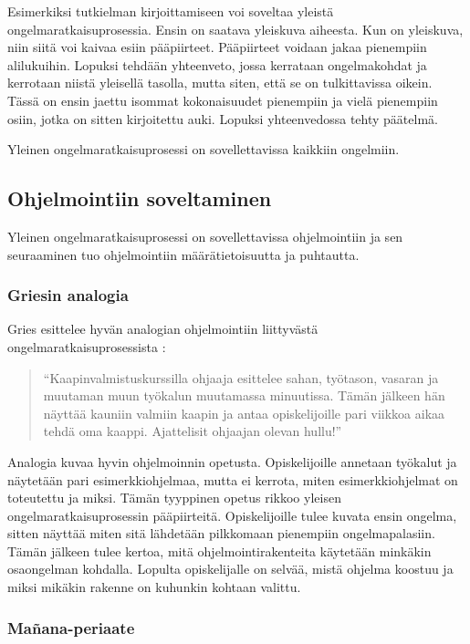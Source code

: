 Esimerkiksi tutkielman kirjoittamiseen voi soveltaa yleistä
ongelmaratkaisuprosessia. Ensin on saatava yleiskuva aiheesta. Kun on yleiskuva,
niin siitä voi kaivaa esiin pääpiirteet. Pääpiirteet voidaan jakaa pienempiin
alilukuihin. Lopuksi tehdään yhteenveto, jossa kerrataan ongelmakohdat ja
kerrotaan niistä yleisellä tasolla, mutta siten, että se on tulkittavissa
oikein. Tässä on ensin jaettu isommat kokonaisuudet pienempiin ja vielä
pienempiin osiin, jotka on sitten kirjoitettu auki. Lopuksi yhteenvedossa tehty
päätelmä.

Yleinen ongelmaratkaisuprosessi on sovellettavissa kaikkiin ongelmiin.

\subsection{Ohjelmointiin soveltaminen}

Yleinen ongelmaratkaisuprosessi on sovellettavissa ohjelmointiin ja sen
seuraaminen tuo ohjelmointiin määrätietoisuutta ja puhtautta.

\subsubsection{Griesin analogia}

Gries esittelee hyvän analogian ohjelmointiin liittyvästä
ongelmaratkaisuprosessista \cite{Gries:1974:WTI:953057.810447}:

\begin{quotation}
``Kaapinvalmistuskurssilla ohjaaja esittelee sahan, työtason, vasaran ja
muutaman muun työkalun muutamassa minuutissa. Tämän jälkeen hän näyttää
kauniin valmiin kaapin ja antaa opiskelijoille pari viikkoa aikaa tehdä oma
kaappi. Ajattelisit ohjaajan olevan hullu!''
\end{quotation}

Analogia kuvaa hyvin ohjelmoinnin opetusta. Opiskelijoille annetaan työkalut ja
näytetään pari esimerkkiohjelmaa, mutta ei kerrota, miten esimerkkiohjelmat on
toteutettu ja miksi. Tämän tyyppinen opetus rikkoo yleisen
ongelmaratkaisuprosessin pääpiirteitä. Opiskelijoille tulee kuvata ensin
ongelma, sitten näyttää miten sitä lähdetään pilkkomaan pienempiin
ongelmapalasiin. Tämän jälkeen tulee kertoa, mitä ohjelmointirakenteita
käytetään minkäkin osaongelman kohdalla. Lopulta opiskelijalle on selvää, mistä
ohjelma koostuu ja miksi mikäkin rakenne on kuhunkin kohtaan valittu.

\subsubsection{Mañana-periaate}

